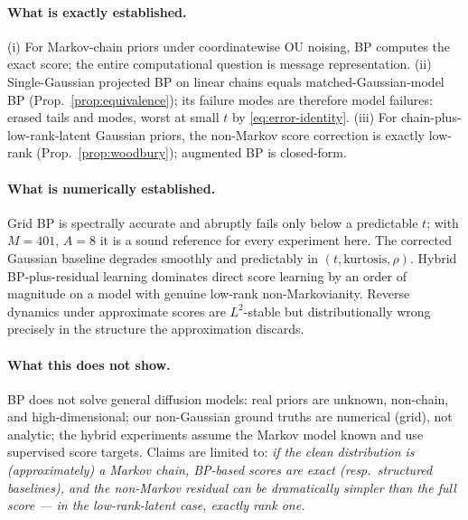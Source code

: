 \documentclass[11pt]{article}
\begin{document}
\paragraph{What is exactly established.}
(i) For Markov-chain priors under coordinatewise OU noising, BP computes the exact
score; the entire computational question is message representation.
(ii) Single-Gaussian projected BP on linear chains equals matched-Gaussian-model BP
(Prop.\ \ref{prop:equivalence}); its failure modes are therefore model failures:
erased tails and modes, worst at small $t$ by \eqref{eq:error-identity}.
(iii) For chain-plus-low-rank-latent Gaussian priors, the non-Markov score correction
is exactly low-rank (Prop.\ \ref{prop:woodbury}); augmented BP is closed-form.

\paragraph{What is numerically established.}
Grid BP is spectrally accurate and abruptly fails only below a predictable $t$;
with $M=401$, $A=8$ it is a sound reference for every experiment here. The corrected
Gaussian baseline degrades smoothly and predictably in $(t,\text{kurtosis},\rho)$.
Hybrid BP-plus-residual learning dominates direct score learning by an order of
magnitude on a model with genuine low-rank non-Markovianity. Reverse dynamics under
approximate scores are $L^2$-stable but distributionally wrong precisely in the
structure the approximation discards.

\paragraph{What this does not show.}
BP does not solve general diffusion models: real priors are unknown, non-chain, and
high-dimensional; our non-Gaussian ground truths are numerical (grid), not analytic;
the hybrid experiments assume the Markov model known and use supervised score targets.
Claims are limited to: \emph{if the clean distribution is (approximately) a Markov
chain, BP-based scores are exact (resp.\ structured baselines), and the non-Markov
residual can be dramatically simpler than the full score --- in the low-rank-latent
case, exactly rank one.}
\end{document}
